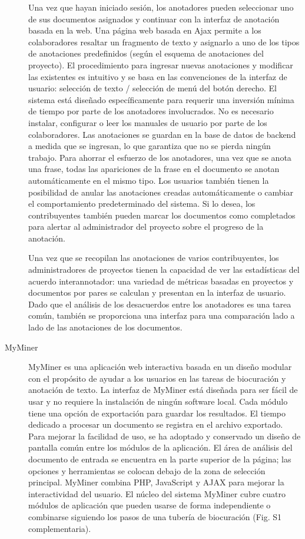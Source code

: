 \begin{description}
Una vez que hayan iniciado sesión, los anotadores pueden seleccionar uno de sus documentos asignados y continuar con la interfaz de anotación basada en la web. Una página web basada en Ajax permite a los colaboradores resaltar un fragmento de texto y asignarlo a uno de los tipos de anotaciones predefinidos (según el esquema de anotaciones del proyecto). El procedimiento para ingresar nuevas anotaciones y modificar las existentes es intuitivo y se basa en las convenciones de la interfaz de usuario: selección de texto / selección de menú del botón derecho. El sistema está diseñado específicamente para requerir una inversión mínima de tiempo por parte de los anotadores involucrados. No es necesario instalar, configurar o leer los manuales de usuario por parte de los colaboradores. Las anotaciones se guardan en la base de datos de backend a medida que se ingresan, lo que garantiza que no se pierda ningún trabajo. Para ahorrar el esfuerzo de los anotadores, una vez que se anota una frase, todas las apariciones de la frase en el documento se anotan automáticamente en el mismo tipo. Los usuarios también tienen la posibilidad de anular las anotaciones creadas automáticamente o cambiar el comportamiento predeterminado del sistema. Si lo desea, los contribuyentes también pueden marcar los documentos como completados para alertar al administrador del proyecto sobre el progreso de la anotación.

Una vez que se recopilan las anotaciones de varios contribuyentes, los administradores de proyectos tienen la capacidad de ver las estadísticas del acuerdo interannotador: una variedad de métricas basadas en proyectos y documentos por pares se calculan y presentan en la interfaz de usuario. Dado que el análisis de los desacuerdos entre los anotadores es una tarea común, también se proporciona una interfaz para una comparación lado a lado de las anotaciones de los documentos.

\item[MyMiner]

MyMiner es una aplicación web interactiva basada en un diseño modular con el propósito de ayudar a los usuarios en las tareas de biocuración y anotación de texto. La interfaz de MyMiner está diseñada para ser fácil de usar y no requiere la instalación de ningún software local. Cada módulo tiene una opción de exportación para guardar los resultados. El tiempo dedicado a procesar un documento se registra en el archivo exportado. Para mejorar la facilidad de uso, se ha adoptado y conservado un diseño de pantalla común entre los módulos de la aplicación. El área de análisis del documento de entrada se encuentra en la parte superior de la página; las opciones y herramientas se colocan debajo de la zona de selección principal. MyMiner combina PHP, JavaScript y AJAX para mejorar la interactividad del usuario. El núcleo del sistema MyMiner cubre cuatro módulos de aplicación que pueden usarse de forma independiente o combinarse siguiendo los pasos de una tubería de biocuración (Fig. S1 complementaria).


\end{description}
